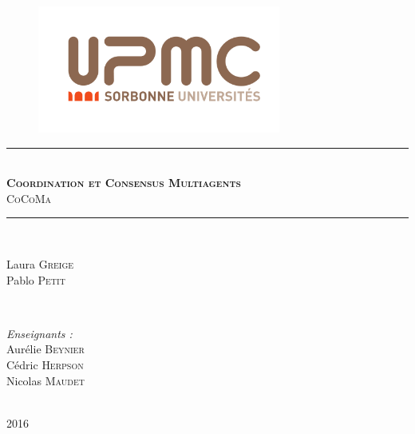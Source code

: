 \documentclass[11pt, letterpaper]{article}
\newcommand{\hmark}{\rule{\linewidth}{0.5mm}}
\begin{document}
\pagestyle{fancy}
\renewcommand{\headrulewidth}{1pt}
\rhead{}

\begin{titlepage}

\centering

\begin{figure}[t]
\begin{center}
\includegraphics[width=8cm]{upmc.png}
\end{center}
\end{figure}

\hmark \\[0.5cm]
\textsc{\textbf{\Large Coordination et Consensus Multiagents}} \\[0.5cm]
\textsc{CoCoMa} \\[0.5cm]
\hmark \\[5cm]

\begin{minipage}{0.4\textwidth}
\begin{flushleft}
Laura \textsc{Greige}\\
Pablo \textsc{Petit}
\end{flushleft}
\end{minipage}
~
\begin{minipage}{0.4\textwidth}
\begin{flushright} \large
\emph{Enseignants :}\\
Aurélie \textsc{Beynier}\\
Cédric \textsc{Herpson}\\
Nicolas \textsc{Maudet}
\end{flushright}
\end{minipage}\\[4cm]

\large 2016

\end{titlepage}

\newpage

\tableofcontents

\newpage

\end{document}
